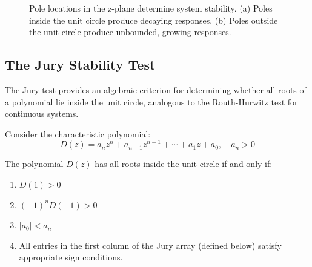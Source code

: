 \begin{figure}[H]
\caption{Pole locations in the z-plane determine system stability. (a) Poles inside the unit circle produce decaying responses. (b) Poles outside the unit circle produce unbounded, growing responses.}
\label{fig:pole_locations}
\end{figure}

\subsection{The Jury Stability Test}

The Jury test provides an algebraic criterion for determining whether all roots of a polynomial lie inside the unit circle, analogous to the Routh-Hurwitz test for continuous systems.

Consider the characteristic polynomial:
\begin{equation}
D(z) = a_n z^n + a_{n-1} z^{n-1} + \cdots + a_1 z + a_0, \quad a_n > 0
\end{equation}

\begin{theorem}
The polynomial $D(z)$ has all roots inside the unit circle if and only if:
\begin{enumerate}
    \item $D(1) > 0$
    \item $(-1)^n D(-1) > 0$
    \item $|a_0| < a_n$
    \item All entries in the first column of the Jury array (defined below) satisfy appropriate sign conditions.
\end{enumerate}
\end{theorem}

